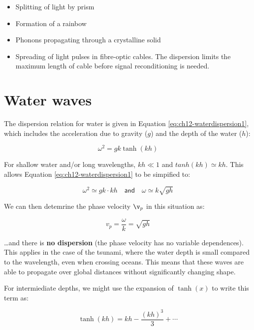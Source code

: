 \documentclass[
]{book}
\providecommand{\tightlist}{%
  \setlength{\itemsep}{0pt}\setlength{\parskip}{0pt}}
\begin{document}
\begin{itemize}
\tightlist
\item
  Splitting of light by prism
\item
  Formation of a rainbow
\item
  Phonons propagating through a crystalline solid
\item
  Spreading of light pulses in fibre-optic cables. The dispersion limits the maximum length of cable before signal reconditioning is needed.
\end{itemize}

\hypertarget{sec:ch12-waterwaves}{%
\section{Water waves}\label{sec:ch12-waterwaves}}

The dispersion relation for water is given in Equation \eqref{eq:ch12-waterdispersion1}, which includes the acceleration due to gravity (\(g\)) and the depth of the water (\(h\)):

\begin{equation}
\omega^2 = gk\tanh(kh)
\label{eq:ch12-waterdispersion1}
\end{equation}

For shallow water and/or long wavelengths, \(kh \ll 1\) and \(tanh(kh) \simeq kh\). This allows Equation \eqref{eq:ch12-waterdispersion1} to be simpified to:

\begin{equation}
\omega^2 \simeq gk \cdot kh \quad \textsf{and} \quad \omega \simeq k \sqrt{gh}
\end{equation}

We can then detemrine the phase velocity \(\v_p\) in this situation as:

\begin{equation}
v_p = \frac{\omega}{k} = \sqrt{gh}
\end{equation}

\ldots and there is \textbf{no dispersion} (the phase velocity has no variable dependences). This applies in the case of the tsunami, where the water depth is small compared to the wavelength, even when crossing oceans. This means that these waves are able to propagate over global distances without significantly changing shape.

For intermiediate depths, we might use the expansion of \(\tanh(x)\) to write this term as:

\begin{equation}
\tanh(kh) = kh - \frac{(kh)^3}{3} + \cdots
\end{equation}
\end{document}
